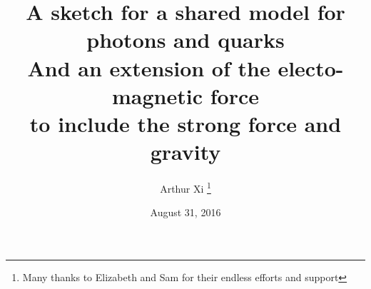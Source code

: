 \title{A sketch for a shared model for photons and quarks\\
\large And an extension of the electo-magnetic force\\
to include the strong force and gravity}
\date{August 31, 2016}
\author{Arthur Xi
\thanks{Many thanks to Elizabeth and Sam for their endless efforts and support}}

\maketitle
